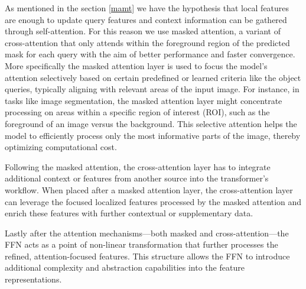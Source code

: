 As mentioned in the section \ref{mamt} we have the hypothesis that local features are enough to update query features and context information can be 
gathered through self-attention. For this reason we use masked attention, a variant of cross-attention that only attends within the foreground region of 
the predicted mask for each query with the aim of better performance and faster convergence. More specifically the masked attention layer is used to focus 
the model’s attention selectively based on certain predefined or learned criteria like the object queries, typically aligning with relevant areas of the 
input image. For instance, in tasks like image segmentation, the masked attention layer might concentrate processing on areas within a specific region of 
interest (ROI), such as the foreground of an image versus the background. This selective attention helps the model to efficiently process only the most 
informative parts of the image, thereby optimizing computational cost.


Following the masked attention, the cross-attention layer has to integrate additional context or features from another source into the transformer’s workflow. 
When placed after a masked attention layer, the cross-attention layer can leverage the focused localized features processed by the masked attention and enrich 
these features with further contextual or supplementary data. 

Lastly after the attention mechanisms—both masked and cross-attention—the FFN acts as a point of non-linear transformation that further processes the refined, 
attention-focused features. This structure allows the FFN to introduce additional complexity and abstraction capabilities into the feature representations.



